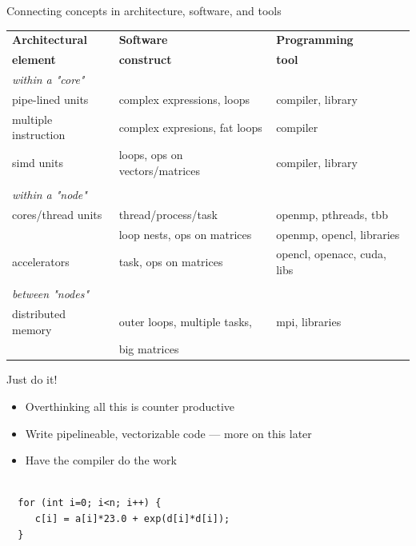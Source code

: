 \begin{frame}[shrink=20]{Connecting concepts in architecture, software, and tools}

\begin{center}
\begin{tabular}{l|l|l}
{\bf Architectural}  &     {\bf Software}            &   {\bf Programming} \\
{\bf element}        &     {\bf construct}           & {\bf tool} \\ \hline
 {\it within a "core"} & & \\
 pipe-lined units    &  complex expressions, loops   & compiler, library \\
 multiple instruction& complex expresions, fat loops &           compiler \\
 simd units & loops, ops on vectors/matrices         & compiler, library \\
 & & \\
 {\it within a "node"} & & \\
 cores/thread units  &  thread/process/task          &  openmp, pthreads, tbb \\
                     &  loop nests, ops on matrices  & openmp, opencl, libraries \\
 accelerators        &   task, ops on matrices       & opencl, openacc, cuda, libs \\
 & & \\
 {\it between "nodes"} & & \\
 distributed memory & outer loops, multiple tasks, &  mpi, libraries \\ 
                    &  big matrices                & \\ \hline
\end{tabular}
\end{center}
  
\end{frame}

\begin{frame}[fragile]{Just do it!}
  \begin{itemize}
  \item Overthinking all this is counter productive
  \item Write pipelineable, vectorizable code --- more on this later
  \item Have the compiler do the work
  \end{itemize}

\begin{verbatim}

  for (int i=0; i<n; i++) {
     c[i] = a[i]*23.0 + exp(d[i]*d[i]);
  }
\end{verbatim}
\end{frame}

